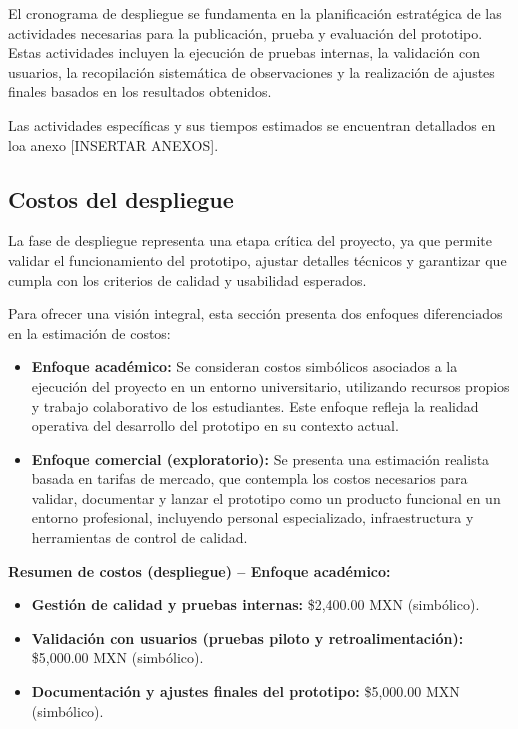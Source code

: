 El cronograma de despliegue se fundamenta en la planificación estratégica de las actividades necesarias para la publicación, prueba y evaluación del prototipo. Estas actividades incluyen la ejecución de pruebas internas, la validación con usuarios, la recopilación sistemática de observaciones y la realización de ajustes finales basados en los resultados obtenidos.

Las actividades específicas y sus tiempos estimados se encuentran detallados en loa anexo [INSERTAR ANEXOS].

\subsection{Costos del despliegue}

La fase de despliegue representa una etapa crítica del proyecto, ya que permite validar el funcionamiento del prototipo, ajustar detalles técnicos y garantizar que cumpla con los criterios de calidad y usabilidad esperados.

Para ofrecer una visión integral, esta sección presenta dos enfoques diferenciados en la estimación de costos:

\begin{itemize}
	\item \textbf{Enfoque académico:} Se consideran costos simbólicos asociados a la ejecución del proyecto en un entorno universitario, utilizando recursos propios y trabajo colaborativo de los estudiantes. Este enfoque refleja la realidad operativa del desarrollo del prototipo en su contexto actual.
	
	\item \textbf{Enfoque comercial (exploratorio):} Se presenta una estimación realista basada en tarifas de mercado, que contempla los costos necesarios para validar, documentar y lanzar el prototipo como un producto funcional en un entorno profesional, incluyendo personal especializado, infraestructura y herramientas de control de calidad.
\end{itemize}

\vspace{1em}
\noindent\textbf{Resumen de costos (despliegue) – Enfoque académico:}
\begin{itemize}
	\item \textbf{Gestión de calidad y pruebas internas:} \$2,400.00 MXN (simbólico).
	\item \textbf{Validación con usuarios (pruebas piloto y retroalimentación):} \$5,000.00 MXN (simbólico).
	\item \textbf{Documentación y ajustes finales del prototipo:} \$5,000.00 MXN (simbólico).
\end{itemize}

